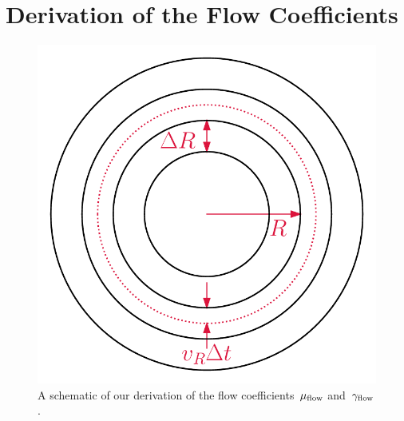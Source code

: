 \documentclass[main.tex]{subfiles}
\begin{document}
\chapter{Derivation of the Flow Coefficients}
\label{outflows:sec:coefficients-derivation}

\begin{figure}
\centering
\includegraphics[scale = 0.5]{chapter7/schematic.pdf}
\caption{
A schematic of our derivation of the flow coefficients~$\mu_{\text{flow}}$
and~$\gamma_{\text{flow}}$.}
\label{outflows:fig:coefficients-schematic}
\end{figure}
\end{document}
